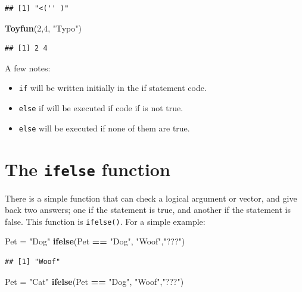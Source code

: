 \documentclass[
]{book}
\newenvironment{Shaded}{\begin{snugshade}}{\end{snugshade}}
\newcommand{\DecValTok}[1]{\textcolor[rgb]{0.00,0.00,0.81}{#1}}
\newcommand{\KeywordTok}[1]{\textcolor[rgb]{0.13,0.29,0.53}{\textbf{#1}}}
\newcommand{\NormalTok}[1]{#1}
\newcommand{\OperatorTok}[1]{\textcolor[rgb]{0.81,0.36,0.00}{\textbf{#1}}}
\newcommand{\StringTok}[1]{\textcolor[rgb]{0.31,0.60,0.02}{#1}}
\begin{document}
\begin{verbatim}
## [1] "<('' )"
\end{verbatim}

\begin{Shaded}
\begin{Highlighting}[]
\KeywordTok{Toyfun}\NormalTok{(}\DecValTok{2}\NormalTok{,}\DecValTok{4}\NormalTok{, }\StringTok{"Typo"}\NormalTok{)}
\end{Highlighting}
\end{Shaded}

\begin{verbatim}
## [1] 2 4
\end{verbatim}

A few notes:

\begin{itemize}
\item
  \texttt{if} will be written initially in the if statement code.
\item
  \texttt{else} if will be executed if code if is not true.
\item
  \texttt{else} will be executed if none of them are true.
\end{itemize}

\hypertarget{the-ifelse-function}{%
\section{\texorpdfstring{The \texttt{ifelse} function}{The ifelse function}}\label{the-ifelse-function}}

There is a simple function that can check a logical argument or vector, and give back two answers; one if the statement is
true, and another if the statement is false. This function is \texttt{ifelse()}. For a simple example:

\begin{Shaded}
\begin{Highlighting}[]
\NormalTok{Pet =}\StringTok{ "Dog"}
\KeywordTok{ifelse}\NormalTok{(Pet }\OperatorTok{==}\StringTok{ "Dog"}\NormalTok{, }\StringTok{"Woof"}\NormalTok{,}\StringTok{"???"}\NormalTok{)}
\end{Highlighting}
\end{Shaded}

\begin{verbatim}
## [1] "Woof"
\end{verbatim}

\begin{Shaded}
\begin{Highlighting}[]
\NormalTok{Pet =}\StringTok{ "Cat"}
\KeywordTok{ifelse}\NormalTok{(Pet }\OperatorTok{==}\StringTok{ "Dog"}\NormalTok{, }\StringTok{"Woof"}\NormalTok{,}\StringTok{"???"}\NormalTok{)}
\end{Highlighting}
\end{Shaded}
\end{document}
